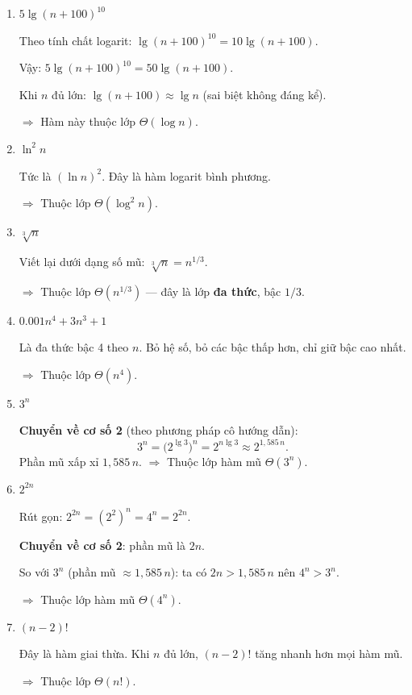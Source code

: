 \documentclass[12pt,a4paper]{article}
\begin{document}
\begin{enumerate}[label=\textbf{\arabic*.}]

  \item $5\lg(n+100)^{10}$

  Theo tính chất logarit: $\lg(n+100)^{10} = 10\lg(n+100)$.

  Vậy: $5\lg(n+100)^{10} = 50\lg(n+100)$.

  Khi $n$ đủ lớn: $\lg(n+100) \approx \lg n$ (sai biệt không đáng kể).

  $\Longrightarrow$ Hàm này thuộc lớp $\Theta(\log n)$.

  \item $\ln^2 n$

  Tức là $(\ln n)^2$. Đây là hàm logarit bình phương.

  $\Longrightarrow$ Thuộc lớp $\Theta(\log^2 n)$.

  \item $\sqrt[3]{n}$

  Viết lại dưới dạng số mũ: $\sqrt[3]{n} = n^{1/3}$.

  $\Longrightarrow$ Thuộc lớp $\Theta(n^{1/3})$ --- đây là lớp \textbf{đa thức}, bậc $1/3$.

  \item $0.001n^4 + 3n^3 + 1$

  Là đa thức bậc 4 theo $n$. Bỏ hệ số, bỏ các bậc thấp hơn, chỉ giữ bậc cao nhất.

  $\Longrightarrow$ Thuộc lớp $\Theta(n^4)$.

  \item $3^n$

  \textbf{Chuyển về cơ số 2} (theo phương pháp cô hướng dẫn):
  \[
    3^n = \bigl(2^{\lg 3}\bigr)^n = 2^{n\lg 3} \approx 2^{1{,}585\,n}.
  \]
  Phần mũ xấp xỉ $1{,}585\,n$. $\Longrightarrow$ Thuộc lớp hàm mũ $\Theta(3^n)$.

  \item $2^{2n}$

  Rút gọn: $2^{2n} = (2^2)^n = 4^n = 2^{2n}$.

  \textbf{Chuyển về cơ số 2}: phần mũ là $2n$.

  So với $3^n$ (phần mũ $\approx 1{,}585\,n$): ta có $2n > 1{,}585\,n$ nên $4^n > 3^n$.

  $\Longrightarrow$ Thuộc lớp hàm mũ $\Theta(4^n)$.

  \item $(n-2)!$

  Đây là hàm giai thừa. Khi $n$ đủ lớn, $(n-2)!$ tăng nhanh hơn mọi hàm mũ.

  $\Longrightarrow$ Thuộc lớp $\Theta(n!)$.

\end{enumerate}
\end{document}
